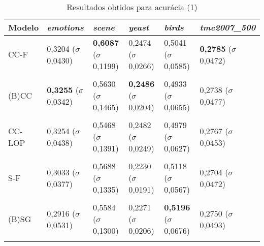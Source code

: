 
\begin{table}[htbp]
	\centering
	\caption{Resultados obtidos para acurácia (1)}
		\begin{tabular}
        { p{0.88in} p{0.88in} p{0.88in} p{0.88in} p{0.88in} p{0.88in} }
        
        \hline
Modelo & \textit{emotions} & \textit{scene} & \textit{yeast} & \textit{birds} & \textit{tmc2007\_500} \\ 
\hline

CC-F & 0,3204 \newline ($\sigma$ 0,0430) & \textbf{0,6087} \newline ($\sigma$ 0,1199) & 0,2474 \newline ($\sigma$ 0,0266) & 0,5041 \newline ($\sigma$ 0,0585) & \textbf{0,2785} \newline ($\sigma$ 0,0472) \\ \\
(B)CC & \textbf{0,3255} \newline ($\sigma$ 0,0342) & 0,5630 \newline ($\sigma$ 0,1465) & \textbf{0,2486} \newline ($\sigma$ 0,0204) & 0,4933 \newline ($\sigma$ 0,0655) & 0,2738 \newline ($\sigma$ 0,0477) \\ \\
CC-LOP & 0,3254 \newline ($\sigma$ 0,0438) & 0,5468 \newline ($\sigma$ 0,1391) & 0,2482 \newline ($\sigma$ 0,0249) & 0,4979 \newline ($\sigma$ 0,0627) & 0,2767 \newline ($\sigma$ 0,0453) \\ \\
S-F & 0,3033 \newline ($\sigma$ 0,0377) & 0,5688 \newline ($\sigma$ 0,1335) & 0,2230 \newline ($\sigma$ 0,0191) & 0,5118 \newline ($\sigma$ 0,0567) & 0,2704 \newline ($\sigma$ 0,0472) \\ \\
(B)SG & 0,2916 \newline ($\sigma$ 0,0531) & 0,5584 \newline ($\sigma$ 0,1300) & 0,2271 \newline ($\sigma$ 0,0206) & \textbf{0,5196} \newline ($\sigma$ 0,0676) & 0,2750 \newline ($\sigma$ 0,0493) \\ \\

\end{tabular}
\end{table}
